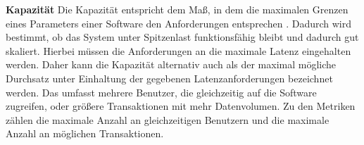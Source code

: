 \noindent
\textbf{Kapazität}\newline
Die Kapazität entspricht dem Maß, in dem die maximalen Grenzen eines Parameters einer Software den Anforderungen entsprechen \cite{ISOIEC.}. Dadurch wird bestimmt, ob das System unter Spitzenlast funktionsfähig bleibt und dadurch gut skaliert. Hierbei müssen die Anforderungen an die maximale Latenz eingehalten werden. Daher kann die Kapazität alternativ auch als der maximal mögliche Durchsatz unter Einhaltung der gegebenen Latenzanforderungen bezeichnet werden. \cite{Barbacci.1995}  Das umfasst mehrere Benutzer, die gleichzeitig auf die Software zugreifen, oder größere Transaktionen mit mehr Datenvolumen. Zu den Metriken zählen die maximale Anzahl an gleichzeitigen Benutzern und die maximale Anzahl an möglichen Transaktionen. \\